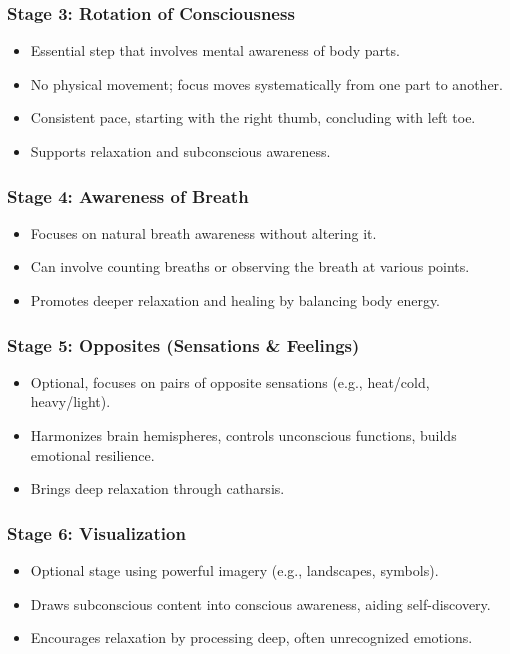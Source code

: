 \begin{frame}[fragile]\frametitle{Stage 3: Rotation of Consciousness}
    \begin{itemize}
        \item Essential step that involves mental awareness of body parts.
        \item No physical movement; focus moves systematically from one part to another.
        \item Consistent pace, starting with the right thumb, concluding with left toe.
        \item Supports relaxation and subconscious awareness.
    \end{itemize}
\end{frame}

\begin{frame}[fragile]\frametitle{Stage 4: Awareness of Breath}
    \begin{itemize}
        \item Focuses on natural breath awareness without altering it.
        \item Can involve counting breaths or observing the breath at various points.
        \item Promotes deeper relaxation and healing by balancing body energy.
    \end{itemize}
\end{frame}

\begin{frame}[fragile]\frametitle{Stage 5: Opposites (Sensations \& Feelings)}
    \begin{itemize}
        \item Optional, focuses on pairs of opposite sensations (e.g., heat/cold, heavy/light).
        \item Harmonizes brain hemispheres, controls unconscious functions, builds emotional resilience.
        \item Brings deep relaxation through catharsis.
    \end{itemize}
\end{frame}

\begin{frame}[fragile]\frametitle{Stage 6: Visualization}
    \begin{itemize}
        \item Optional stage using powerful imagery (e.g., landscapes, symbols).
        \item Draws subconscious content into conscious awareness, aiding self-discovery.
        \item Encourages relaxation by processing deep, often unrecognized emotions.
    \end{itemize}
\end{frame}

